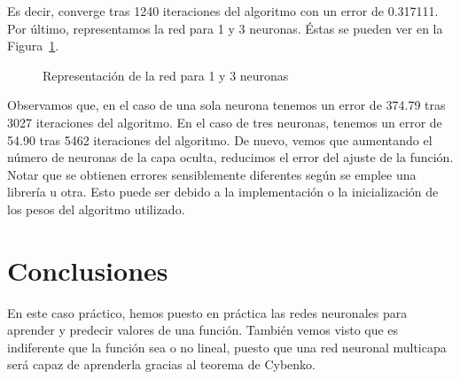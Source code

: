 \documentclass[12pt,a4paper,twoside,openright,titlepage,final]{article}
\begin{document}
Es decir, converge tras 1240 iteraciones del algoritmo con un error de 0.317111.\\

Por último, representamos la red para 1 y 3 neuronas. Éstas se pueden ver en la Figura~\ref{fig:representacion_red}.\\

\begin{figure}[htbp!]
\centering
{}
\caption{Representación de la red para 1 y 3 neuronas} \label{fig:representacion_red}
\end{figure}

Observamos que, en el caso de una sola neurona tenemos un error de 374.79 tras 3027 iteraciones del algoritmo. En el caso de tres neuronas, tenemos un error de 54.90 tras 5462 iteraciones del algoritmo. De nuevo, vemos que aumentando el número de neuronas de la capa oculta, reducimos el error del ajuste de la función. Notar que se obtienen errores sensiblemente diferentes según se emplee una librería u otra. Esto puede ser debido a la implementación o la inicialización de los pesos del algoritmo utilizado.


\section{Conclusiones}

En este caso práctico, hemos puesto en práctica las redes neuronales para aprender y predecir valores de una función. También vemos visto que es indiferente que la función sea o no lineal, puesto que una red neuronal multicapa será capaz de aprenderla gracias al teorema de Cybenko.\\
\end{document}
